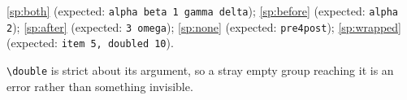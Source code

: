 \documentclass{article}
\begin{document}
\ref{sp:both} (expected: \texttt{alpha beta 1 gamma delta});
\ref{sp:before} (expected: \texttt{alpha 2});
\ref{sp:after} (expected: \texttt{3 omega});
\ref{sp:none} (expected: \texttt{pre4post});
\ref{sp:wrapped} (expected: \texttt{item 5, doubled 10}).

\verb|\double| is strict about its argument, so a stray empty group reaching it
is an error rather than something invisible.
\end{document}
